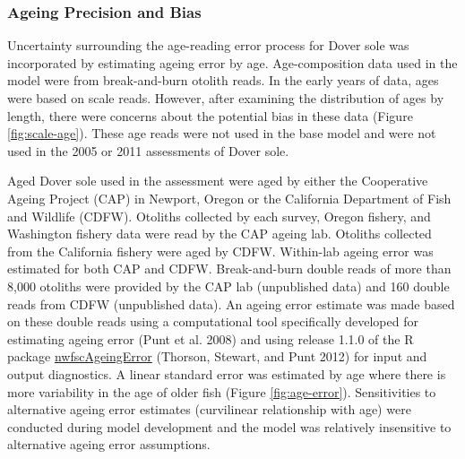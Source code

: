 \documentclass[11pt,
  english,
  a4paper,
]{article}
\begin{document}
\leavevmode\tagmcend\tagstructend\par


\hypertarget{ageing-precision-and-bias}{%
\subsubsection{Ageing Precision and Bias}\label{ageing-precision-and-bias}}

\leavevmode\tagmcend\tagstructend


Uncertainty surrounding the age-reading error process for Dover sole was incorporated by estimating ageing error by age. Age-composition data used in the model were from break-and-burn otolith reads. In the early years of data, ages were based on scale reads. However, after examining the distribution of ages by length, there were concerns about the potential bias in these data (Figure \ref{fig:scale-age}). These age reads were not used in the base model and were not used in the 2005 or 2011 assessments of Dover sole.

\leavevmode\tagmcend\tagstructend\par


Aged Dover sole used in the assessment were aged by either the Cooperative Ageing Project (CAP) in Newport, Oregon or the California Department of Fish and Wildlife (CDFW). Otoliths collected by each survey, Oregon fishery, and Washington fishery data were read by the CAP ageing lab. Otoliths collected from the California fishery were aged by CDFW. Within-lab ageing error was estimated for both CAP and CDFW. Break-and-burn double reads of more than 8,000 otoliths were provided by the CAP lab (unpublished data) and 160 double reads from CDFW (unpublished data). An ageing error estimate was made based on these double reads using a computational tool specifically developed for estimating ageing error {(Punt et al. 2008)\leavevmode\tagmcend\tagstructend} and using release 1.1.0 of the R package \href{https://github.com/nwfsc-assess/nwfscAgeingError}{nwfscAgeingError} {(Thorson, Stewart, and Punt 2012)\leavevmode\tagmcend\tagstructend} for input and output diagnostics. A linear standard error was estimated by age where there is more variability in the age of older fish (Figure \ref{fig:age-error}). Sensitivities to alternative ageing error estimates (curvilinear relationship with age) were conducted during model development and the model was relatively insensitive to alternative ageing error assumptions.
\end{document}
